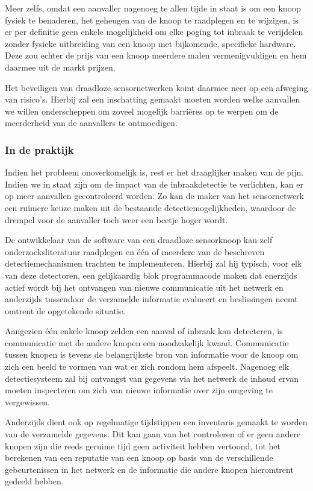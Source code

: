 \documentclass[DIV=calc,paper=a4,fontsize=11pt,twocolumn]{scrartcl}
\newcommand{\heading}[1]{
\subsubsection*{#1}
\vspace{-2mm}
}
\begin{document}
Meer zelfs, omdat een aanvaller nagenoeg te allen tijde in staat is om een
knoop fysiek te benaderen, het geheugen van de knoop te raadplegen en te
wijzigen, is er per definitie geen enkele mogelijkheid om elke poging tot
inbraak te verijdelen zonder fysieke uitbreiding van een knoop met bijkomende,
specifieke hardware. Deze zou echter de prijs van een knoop meerdere malen
vermenigvuldigen en hem daarmee uit de markt prijzen.

Het beveiligen van draadloze sensornetwerken komt daarmee neer op een afweging
van risico's. Hierbij zal een inschatting gemaakt moeten worden welke aanvallen
we willen onderscheppen om zoveel mogelijk barri\`eres op te werpen om de
meerderheid van de aanvallers te ontmoedigen.

\heading{In de praktijk}

Indien het probleem onoverkomelijk is, rest er het draaglijker maken van de
pijn. Indien we in staat zijn om de impact van de inbraakdetectie te
verlichten, kan er op meer aanvallen gecontroleerd worden. Zo kan de maker van
het sensornetwerk een ruimere keuze maken uit de bestaande
detectiemogelijkheden, waardoor de drempel voor de aanvaller toch weer een
beetje hoger wordt.

De ontwikkelaar van de software van een draadloze sensorknoop kan zelf
onderzoeksliteratuur raadplegen en \'e\'en of meerdere van de beschreven
detectiemechanismen trachten te implementeren. Hierbij zal hij typisch, voor
elk van deze detectoren, een gelijkaardig blok programmacode maken dat
enerzijds actief wordt bij het ontvangen van nieuwe communicatie uit het
netwerk en anderzijds tussendoor de verzamelde informatie evalueert en
beslissingen neemt omtrent de opgetekende situatie.

Aangezien \'e\'en enkele knoop zelden een aanval of inbraak kan detecteren, is
communicatie met de andere knopen een noodzakelijk kwaad. Communicatie tussen
knopen is tevens de belangrijkste bron van informatie voor de knoop om zich een
beeld te vormen van wat er zich rondom hem afspeelt. Nagenoeg elk
detectiesysteem zal bij ontvangst van gegevens via het netwerk de inhoud ervan
moeten inspecteren om zich van nieuwe informatie over zijn omgeving te
vergewissen.

Anderzijds dient ook op regelmatige tijdstippen een inventaris gemaakt te
worden van de verzamelde gegevens. Dit kan gaan van het controleren of er geen
andere knopen zijn die reeds geruime tijd geen activiteit hebben vertoond, tot
het berekenen van een reputatie van een knoop op basis van de verschillende
gebeurtenissen in het netwerk en de informatie die andere knopen hieromtrent
gedeeld hebben.
\end{document}
